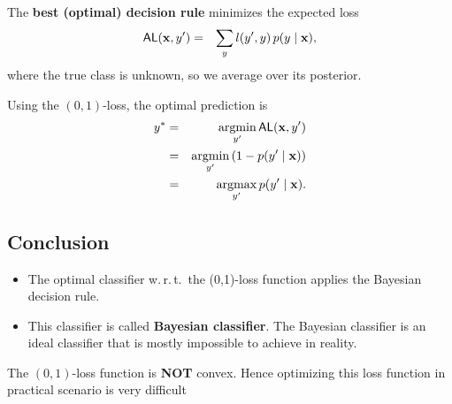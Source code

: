 \noindent
The \textbf{best (optimal) decision rule} minimizes the expected loss
\begin{eqnarray*}
	\mathsf{AL}(\bm{\mathrm{x}} , y') &=& \sum\limits_{y} l(y',y)\,p(y\mid\bm{\mathrm{x}}),
\end{eqnarray*}
where the true class is unknown, so we average over its posterior.

Using the $(0,1)$-loss, the optimal prediction is
	\begin{eqnarray*}
		y^* &=& \operatorname*{argmin}\limits_{y'} \mathsf{AL}(\bm{\mathrm{x}}, y')\\
		        &=& \operatorname*{argmin}\limits_{y'} \left(1-p(y'\mid\bm{\mathrm{x}})\right)\\ 
		        &=& \operatorname*{argmax}\limits_{y'} p(y'\mid\bm{\mathrm{x}}).\\
	\end{eqnarray*}
	
	\subsection{Conclusion}

	\begin{itemize}
		\item The optimal classifier w.\,r.\,t.\ the (0,1)-loss function applies the Bayesian decision rule.
		\item This classifier is called \textbf{Bayesian classifier}. The Bayesian classifier is an ideal classifier that is mostly impossible to achieve in reality.  
	\end{itemize}
	

    \noindent
    \vorsicht The $(0,1)$-loss function is {\bf NOT} convex. Hence optimizing this loss function in practical scenario is very difficult 


